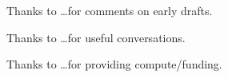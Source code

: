 Thanks to \ldots for comments on early drafts.

Thanks to \ldots for useful conversations.

Thanks to \ldots for providing compute/funding.

